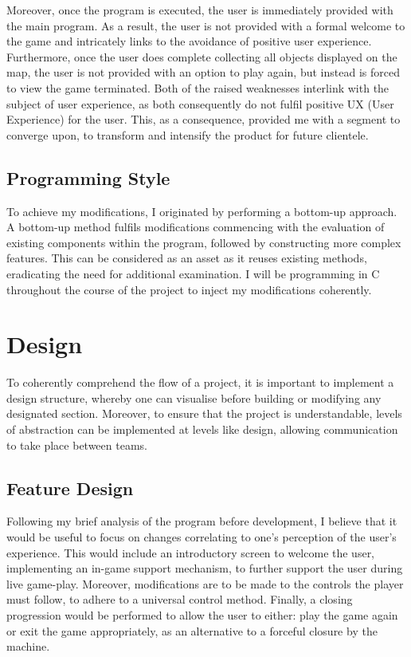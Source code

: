 \documentclass{article}
\begin{document}
Moreover, once the program is executed, the user is immediately provided with the main program. As a result, the user is not provided with a formal welcome to the game and intricately links to the avoidance of positive user experience. Furthermore, once the user does complete collecting all objects displayed on the map, the user is not provided with an option to play again, but instead is forced to view the game terminated. Both of the raised weaknesses interlink with the subject of user experience, as both consequently do not fulfil positive UX (User Experience) for the user. This, as a consequence, provided me with a segment to converge upon, to transform and intensify the product for future clientele.

\subsection{Programming Style}
To achieve my modifications, I originated by performing a bottom-up approach. \cite{bottom-up} A bottom-up method fulfils modifications commencing with the evaluation of existing components within the program, followed by constructing more complex features. This can be considered as an asset as it reuses existing methods, eradicating the need for additional examination. I will be programming in C throughout the course of the project to inject my modifications coherently.


\section{Design}\label{sec:design}
To coherently comprehend the flow of a project, it is important to implement a design structure, whereby one can visualise before building or modifying any designated section. Moreover, to ensure that the project is understandable, levels of abstraction can be implemented at levels like design, allowing communication to take place between teams.



\subsection{Feature Design}
Following my brief analysis of the program before development, I believe that it would be useful to focus on changes correlating to one's perception of the user's experience. This would include an introductory screen to welcome the user, implementing an in-game support mechanism, to further support the user during live game-play.  Moreover, modifications are to be made to the controls the player must follow, to adhere to a universal control method. Finally, a closing progression would be performed to allow the user to either: play the game again or exit the game appropriately, as an alternative to a forceful closure by the machine.
\end{document}

